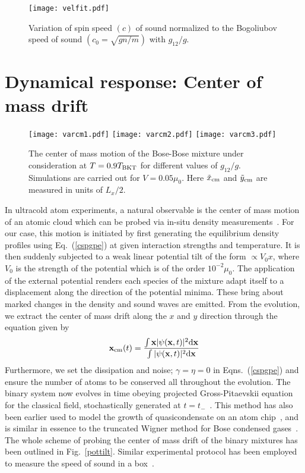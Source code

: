 \documentclass[pra,twocolumn,aps,showpacs,longbibliography]{revtex4-1}
\begin{document}
\begin{figure}
        \texttt{[image: velfit.pdf]}
	\caption{Variation of spin speed $(c)$ of sound normalized to the Bogoliubov speed of 
		 sound $(c_0 = \sqrt{gn/m})$ with $g_{12}/g$.
          }
        \label{velfit}
\end{figure}




\section{Dynamical response: Center of mass drift}\label{results}

\begin{figure*}
        \texttt{[image: varcm1.pdf]}
        \texttt{[image: varcm2.pdf]}
        \texttt{[image: varcm3.pdf]}
	\caption{The center of mass motion of the Bose-Bose mixture under consideration at $T=0.9T_{\rm BKT}$ for 
		 different values of $g_{12}/g$. Simulations are carried out for $V=0.05\mu_0$. Here ${\tilde x}_{\rm cm}$
		 and ${\tilde y}_{\rm cm}$ are measured in units of $L_x/2$.}
        \label{varcm}
\end{figure*}


In ultracold atom experiments, a natural observable is the center of mass
motion of an atomic cloud which can be probed via in-situ density
measurements~\cite{aidelsburger_15,bienaime_16}. For our case, this motion
is initiated by first generating the equilibrium density profiles using
Eq.~(\ref{cspgpe}) at given interaction strengths and temperature. 
It is then suddenly subjected to a weak linear potential tilt of the
form $\propto V_0 x$, where $V_0$ is the strength of the potential  which
is of the order $10^{-2}\mu_0$. The application of the external potential
renders each species of the mixture adapt itself to a displacement
along the direction of the potential minima. These bring about marked 
changes in the density and sound waves are emitted. From the evolution,
we extract the center of mass drift along the $x$ and $y$ direction through 
the equation given by
\begin{equation}
	{\bf x}_{\rm cm}(t) = \frac{\int{\bf x}|\psi({\bf x},t)|^2 {\rm d}{\bf x}}{\int|\psi({\bf x},t)|^2 {\rm d}{\bf x}}
\end{equation}
Furthermore, we set the dissipation and noise;
$\gamma = \eta =0$ in Eqns.~(\ref{cspgpe}) and ensure the number of atoms to
be conserved all throughout the evolution. The binary system now evolves in time
obeying projected Gross-Pitaevskii equation for the classical field, stochastically 
generated at $t=t_-$~\cite{blakie_08,davis_01}. This method has also been earlier
used to model the growth of quasicondensate on an atom chip~\cite{proukakis_06}, 
and is similar in essence to the truncated Wigner method for Bose condensed 
gases~\cite{sinatra_02}. The whole scheme of probing the center of mass drift 
of the binary mixtures has been outlined in Fig.~\ref{pottilt}. Similar experimental protocol 
has been employed to measure the speed of sound in a box~\cite{garratt_19}.
\end{document}
